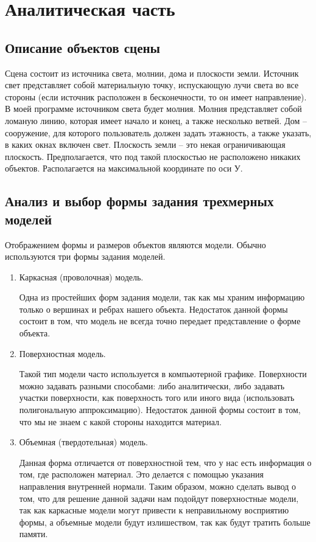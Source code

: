 \chapter{Аналитическая часть}

\section{Описание объектов сцены}

Сцена состоит из источника света, молнии, дома и плоскости земли.
Источник свет представляет собой материальную точку, испускающую лучи света во все стороны (если источник расположен в бесконечности, то он имеет направление). В моей программе источником света будет молния.
Молния представляет собой ломаную линию, которая имеет начало и конец, а также несколько ветвей. 
Дом – сооружение, для которого пользователь должен задать этажность, а также указать, в каких окнах включен свет.
Плоскость земли – это некая ограничивающая плоскость. Предполагается, что под такой плоскостью не расположено никаких объектов. Располагается на максимальной координате по оси У. 


\section{Анализ и выбор формы задания трехмерных моделей}

Отображением формы и размеров объектов являются модели. 
Обычно используются три формы задания моделей.

\begin{enumerate}
	\item Каркасная (проволочная) модель.
	
	Одна из простейших форм задания модели, так как мы храним информацию только о вершинах и ребрах нашего объекта. Недостаток данной формы состоит в том, что модель не всегда точно передает представление о форме объекта.
	
	\item Поверхностная модель.
	
	Такой тип модели часто используется в компьютерной графике. Поверхности можно задавать разными способами: либо аналитически, либо задавать участки поверхности, как поверхность того или иного вида (использовать полигональную аппроксимацию). Недостаток данной формы состоит в том, что мы не знаем с какой стороны находится материал.
	
	\item  Объемная (твердотельная) модель.
	
	Данная форма отличается от поверхностной тем, что у нас есть информация о том, где расположен материал. Это делается с помощью указания направления внутренней нормали. 
	Таким образом, можно сделать вывод о том, что для решение данной задачи нам подойдут поверхностные модели, так как каркасные модели могут привести к неправильному восприятию формы, а объемные модели будут излишеством, так как будут тратить больше памяти.
\end{enumerate}


